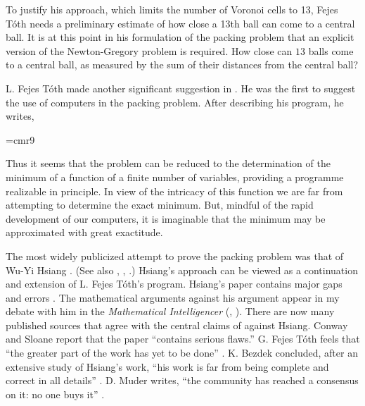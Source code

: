 To justify his approach, which limits the number of Voronoi cells
to 13, Fejes T\'oth needs a preliminary estimate of how close
a 13th ball can come to a central ball.  It is at this point
in his formulation of the packing problem that an explicit
version of the Newton-Gregory problem is required.  How
close can $13$ balls come to a central ball, as measured by
the sum of their distances from the central ball?


L. Fejes T\'oth made another significant suggestion in \cite{Fej64}.
He was the first to suggest the use of computers in the packing problem.
After describing his program, he writes,

{
\narrower
\font\ninerm=cmr9
\ninerm

Thus it seems that the problem can be reduced to the determination
of the minimum of a function of a finite number of variables,
providing a programme realizable in principle.  In view of the
intricacy of this function we are far from attempting to
determine the exact minimum.  But, mindful of the rapid development
of our computers, it is imaginable that the minimum may
be approximated with great exactitude.

}

\smallskip
The most widely publicized attempt to prove the packing problem
was that of Wu-Yi Hsiang \cite{Hsi93}.  (See also \cite{Hsi93a},
\cite{Hsi93b}, \cite{Hsi02}.)  Hsiang's approach can be viewed as
a continuation and extension of L. Fejes T\'oth's program.
Hsiang's paper contains major gaps and errors \cite{CoHMS94}.
  The mathematical arguments against his argument appear
in my
debate with him in the {\it Mathematical Intelligencer}
(\cite{Hal94}, \cite{Hsi95}).
There are now many published sources that agree with the central
claims of \cite{Hal94} against Hsiang.
Conway and Sloane report that the paper ``contains serious flaws.''
G. Fejes T\'oth feels that ``the greater part of the work has yet
to be done'' \cite{Fej95}.   K. Bezdek concluded,
after an extensive study of Hsiang's work, ``his work is far from being
complete and correct in all details'' \cite{Bez97}.
 D. Muder writes, ``the
community has reached a consensus on it: no one buys it'' \cite{Mud97}.



